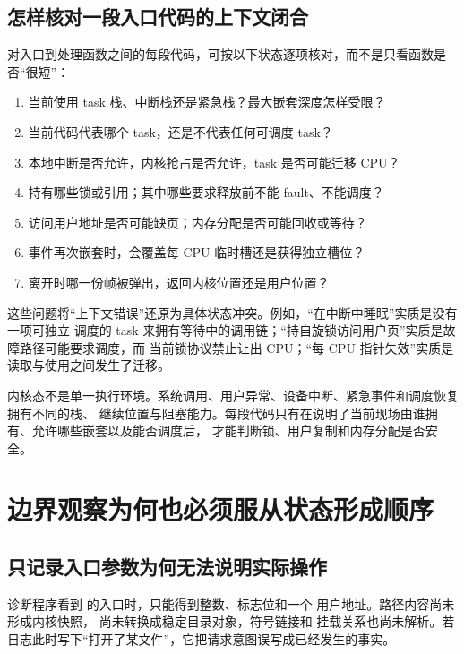 \subsection{怎样核对一段入口代码的上下文闭合}

对入口到处理函数之间的每段代码，可按以下状态逐项核对，而不是只看函数是否“很短”：

\begin{enumerate}
\item 当前使用 task 栈、中断栈还是紧急栈？最大嵌套深度怎样受限？
\item 当前代码代表哪个 task，还是不代表任何可调度 task？
\item 本地中断是否允许，内核抢占是否允许，task 是否可能迁移 CPU？
\item 持有哪些锁或引用；其中哪些要求释放前不能 fault、不能调度？
\item 访问用户地址是否可能缺页；内存分配是否可能回收或等待？
\item 事件再次嵌套时，会覆盖每 CPU 临时槽还是获得独立槽位？
\item 离开时哪一份帧被弹出，返回内核位置还是用户位置？
\end{enumerate}

这些问题将“上下文错误”还原为具体状态冲突。例如，“在中断中睡眠”实质是没有一项可独立
调度的 task 来拥有等待中的调用链；“持自旋锁访问用户页”实质是故障路径可能要求调度，而
当前锁协议禁止让出 CPU；“每 CPU 指针失效”实质是读取与使用之间发生了迁移。

\begin{keyidea}
内核态不是单一执行环境。系统调用、用户异常、设备中断、紧急事件和调度恢复拥有不同的栈、
继续位置与阻塞能力。每段代码只有在说明了当前现场由谁拥有、允许哪些嵌套以及能否调度后，
才能判断锁、用户复制和内存分配是否安全。
\end{keyidea}

\section{边界观察为何也必须服从状态形成顺序}

\subsection{只记录入口参数为何无法说明实际操作}

诊断程序看到  的入口时，只能得到整数、标志位和一个
用户地址。路径内容尚未形成内核快照， 尚未转换成稳定目录对象，符号链接和
挂载关系也尚未解析。若日志此时写下“打开了某文件”，它把请求意图误写成已经发生的事实。

